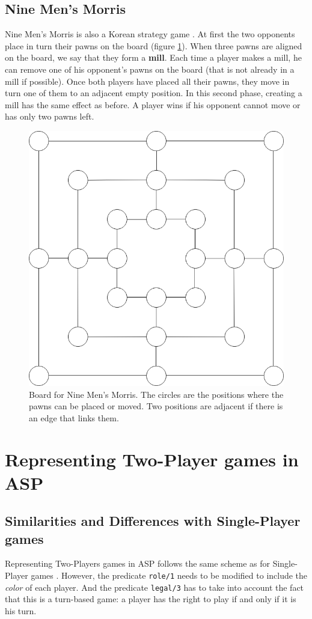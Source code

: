 \subsection{Nine Men's Morris}

Nine Men's Morris is also a Korean strategy game \citep{9MM_rules}. At first the two opponents place in turn their pawns on the board (figure \ref{fig:9MM_initial}). When three pawns are aligned on the board, we say that they form a \textbf{mill}. Each time a player makes a mill, he can remove one of his opponent's pawns on the board (that is not already in a mill if possible). Once both players have placed all their pawns, they move in turn one of them to an adjacent empty position. In this second phase, creating a mill has the same effect as before. A player wins if his opponent cannot move or has only two pawns left.

\begin{figure}[h]
\centering
\includegraphics[width = 0.3\hsize]{figures/9MM_initial.png}
\caption{Board for Nine Men's Morris. The circles are the positions where the pawns can be placed or moved. Two positions are adjacent if there is an edge that links them.}
\label{fig:9MM_initial}
\end{figure}

\section{Representing Two-Player games in ASP}

\subsection{Similarities and Differences with Single-Player games}

Representing Two-Players games in ASP follows the same scheme as for Single-Player games \cite{thielscher2009answer}. However, the predicate \texttt{role/1} needs to be modified to include the \textit{color} of each player. And the predicate \texttt{legal/3} has to take into account the fact that this is a turn-based game: a player has the right to play if and only if it is his turn.

